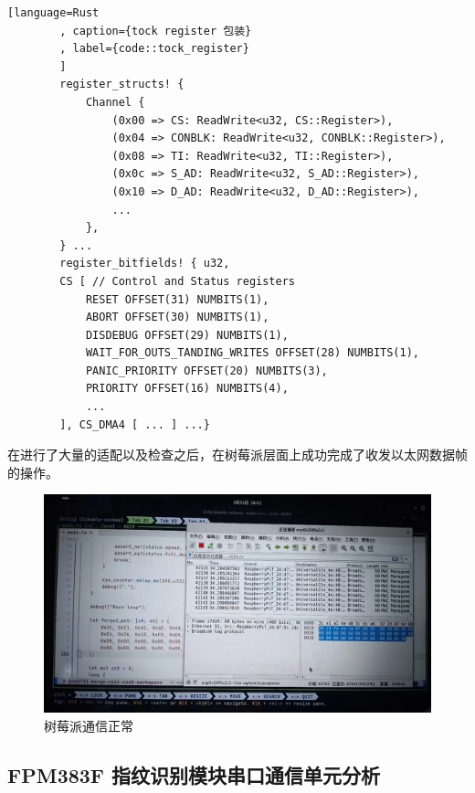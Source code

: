     \begin{lstlisting}[language=Rust
        , caption={tock register 包装}
        , label={code::tock_register}
        ]
        register_structs! {
            Channel {
                (0x00 => CS: ReadWrite<u32, CS::Register>),
                (0x04 => CONBLK: ReadWrite<u32, CONBLK::Register>),
                (0x08 => TI: ReadWrite<u32, TI::Register>),
                (0x0c => S_AD: ReadWrite<u32, S_AD::Register>),
                (0x10 => D_AD: ReadWrite<u32, D_AD::Register>),
                ...
            },
        } ...
        register_bitfields! { u32,
        CS [ // Control and Status registers
            RESET OFFSET(31) NUMBITS(1),
            ABORT OFFSET(30) NUMBITS(1),
            DISDEBUG OFFSET(29) NUMBITS(1),
            WAIT_FOR_OUTS_TANDING_WRITES OFFSET(28) NUMBITS(1),
            PANIC_PRIORITY OFFSET(20) NUMBITS(3),
            PRIORITY OFFSET(16) NUMBITS(4),
            ...
        ], CS_DMA4 [ ... ] ...}
    \end{lstlisting}

    在进行了大量的适配以及检查之后，在树莓派层面上成功完成了收发以太网数据帧的操作。

    \begin{figure}[ht]
        \centering
        \includegraphics[scale=0.3]{./imgs/树莓派通信正常.jpg}
        \caption{树莓派通信正常}    \label{fig::树莓派通信正常}
    \end{figure}





    \subsection{FPM383F 指纹识别模块串口通信单元分析}

